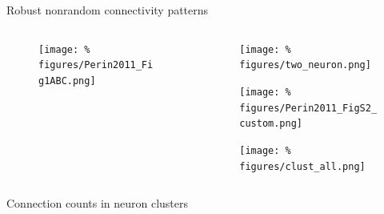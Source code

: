 \begin{frame}{Robust nonrandom connectivity patterns}
  \begin{columns}
    \begin{column}{.45\textwidth}
      \minipage[c][0.75\textheight][s]{\columnwidth}
      
      \begin{figure}
        \centering
        \texttt{[image: \%
          figures/Perin2011\_Fig1ABC.png]} %
      \end{figure}
      

      
      \endminipage      
    \end{column}
    \begin{column}{.55\textwidth}


      \vspace{-0.2cm}
      
      \begin{figure}
        \centering
        \texttt{[image: \%
          figures/two\_neuron.png]} %
      \end{figure}

      \vfill
      

      \begin{figure}
        \centering
        \texttt{[image: \%
        figures/Perin2011\_FigS2\_custom.png]} %
      \end{figure}

      \vfill
      

      \begin{figure}
        \centering
        \texttt{[image: \%
          figures/clust\_all.png]} %
      \end{figure}
      
      \vfill

      
    \end{column}
  \end{columns}


  \pnote{
    
  }
  
\end{frame}



\begin{frame}{Connection counts in neuron clusters}

  


  
\end{frame}



